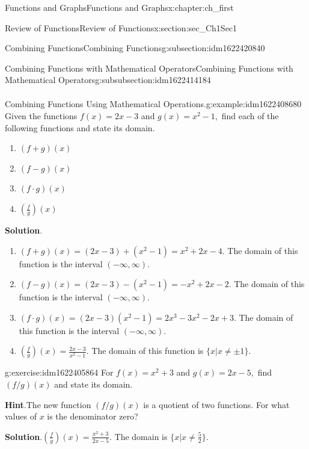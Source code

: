\documentclass[oneside,10pt,]{book}
\newcommand{\blocktitlefont}{\relax}
\numberwithin{equation}{section}
\begin{document}
\begin{chapterptx}{Functions and Graphs}{}{Functions and Graphs}{}{}{x:chapter:ch_first}
\begin{sectionptx}{Review of Functions}{}{Review of Functions}{}{}{x:section:sec_Ch1Sec1}
\begin{subsectionptx}{Combining Functions}{}{Combining Functions}{}{}{g:subsection:idm1622420840}
\begin{subsubsectionptx}{Combining Functions with Mathematical Operators}{}{Combining Functions with Mathematical Operators}{}{}{g:subsubsection:idm1622414184}
\begin{align*}
\end{align*}
\begin{example}{Combining Functions Using Mathematical Operations.}{g:example:idm1622408680}%
Given the functions \(f(x)=2x-3\) and \(g(x)=x^2-1,\) find each of the following functions and state its domain.%
%
\begin{enumerate}
\item{}\(\displaystyle (f+g)(x)\)%
\item{}\(\displaystyle (f-g)(x)\)%
\item{}\(\displaystyle (f·g)(x)\)%
\item{}\(\displaystyle (\frac{f}{g})(x)\)%
\end{enumerate}
\par\smallskip%
\noindent\textbf{\blocktitlefont Solution}.\hypertarget{g:solution:idm1622404200}{}\quad{}%
\begin{enumerate}
\item{}\((f+g)(x)=(2x-3)+(x^2-1)=x^2+2x-4.\) The domain of this function is the interval \((-\infty,\infty).\)%
\item{}\((f-g)(x)=(2x-3)-(x^2-1)=-x^2+2x-2.\) The domain of this function is the interval \((-\infty,\infty).\)%
\item{}\((f·g)(x)=(2x-3)(x^2-1)=2x^3-3x^2-2x+3.\) The domain of this function is the interval \((-\infty,\infty).\)%
\item{}\(\left(\frac{f}{g}\right)(x)=\frac{2x-3}{x^2-1}.\) The domain of this function is \(\{x|x\neq\pm 1\}.\)%
\end{enumerate}
\end{example}
\begin{inlineexercise}{}{g:exercise:idm1622405864}%
For \(f(x)=x^2+3\) and \(g(x)=2x-5,\) find \((f/g)(x)\) and state its domain.%
\par\smallskip%
\noindent\textbf{\blocktitlefont Hint}.\hypertarget{g:hint:idm1622403304}{}\quad{}The new function \((f/g)(x)\) is a quotient of two functions. For what values of \(x\) is the denominator zero?%
\par\smallskip%
\noindent\textbf{\blocktitlefont Solution}.\hypertarget{g:solution:idm1622400872}{}\quad{}\((\frac{f}{g})(x)=\frac{x^2+3}{2x-5}.\) The domain is \(\{x|x\neq\frac{5}{2}\}.\)%
\end{inlineexercise}%
\end{subsubsectionptx}
%
%
\typeout{************************************************}
\typeout{************************************************}

\end{subsectionptx}
\end{sectionptx}
\end{chapterptx}
\end{document}
